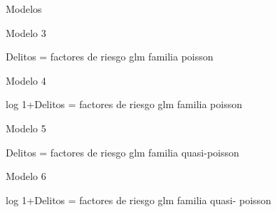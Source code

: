 \documentclass[ignorenonframetext,]{beamer}
\begin{document}
\begin{frame}{Modelos}

\begin{block}{Modelo 3}

Delitos = factores de riesgo glm familia poisson

\end{block}

\begin{block}{Modelo 4}

log 1+Delitos = factores de riesgo glm familia poisson

\end{block}

\begin{block}{Modelo 5}

Delitos = factores de riesgo glm familia quasi-poisson

\end{block}

\begin{block}{Modelo 6}

log 1+Delitos = factores de riesgo glm familia quasi- poisson

\end{block}

\end{frame}
\end{document}
